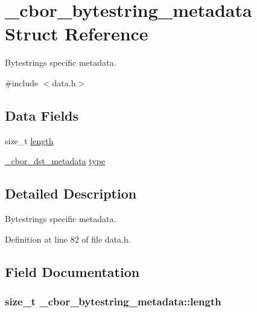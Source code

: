 \hypertarget{struct__cbor__bytestring__metadata}{\section{\-\_\-cbor\-\_\-bytestring\-\_\-metadata Struct Reference}
\label{struct__cbor__bytestring__metadata}
}


Bytestrings specific metadata.  




{\ttfamily \#include $<$data.\-h$>$}

\subsection*{Data Fields}
\begin{DoxyCompactItemize}
\item 
size\-\_\-t \hyperlink{struct__cbor__bytestring__metadata_ad20fa7f7cec11db8076419169347ff75}{length}
\item 
\hyperlink{data_8h_a3cdab5e05cf46846e98b43cf77985589}{\-\_\-cbor\-\_\-dst\-\_\-metadata} \hyperlink{struct__cbor__bytestring__metadata_ab43be7eca10ef7f0501d9f87482e27c3}{type}
\end{DoxyCompactItemize}


\subsection{Detailed Description}
Bytestrings specific metadata. 

Definition at line 82 of file data.\-h.



\subsection{Field Documentation}
\hypertarget{struct__cbor__bytestring__metadata_ad20fa7f7cec11db8076419169347ff75}{
\subsubsection[{length}]{\setlength{\rightskip}{0pt plus 5cm}size\-\_\-t \-\_\-cbor\-\_\-bytestring\-\_\-metadata\-::length}}\label{struct__cbor__bytestring__metadata_ad20fa7f7cec11db8076419169347ff75}


